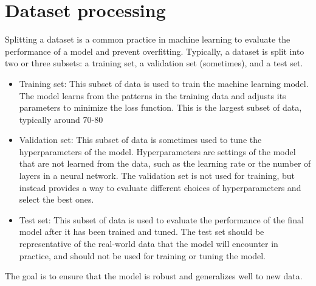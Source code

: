 \documentclass{article}
\begin{document}
\section{Dataset processing}
Splitting a dataset is a common practice in machine learning to evaluate the performance of a model and prevent overfitting. Typically, a dataset is split into two or three subsets: a training set, a validation set (sometimes), and a test set.\\
\begin{itemize}
    \item Training set: This subset of data is used to train the machine learning model. The model learns from the patterns in the training data and adjusts its parameters to minimize the loss function. This is the largest subset of data, typically around 70-80%
    \item Validation set: This subset of data is sometimes used to tune the hyperparameters of the model. Hyperparameters are settings of the model that are not learned from the data, such as the learning rate or the number of layers in a neural network. The validation set is not used for training, but instead provides a way to evaluate different choices of hyperparameters and select the best ones.
    \item Test set: This subset of data is used to evaluate the performance of the final model after it has been trained and tuned. The test set should be representative of the real-world data that the model will encounter in practice, and should not be used for training or tuning the model.
\end{itemize}
The goal is to ensure that the model is robust and generalizes well to new data.\\
\end{document}

